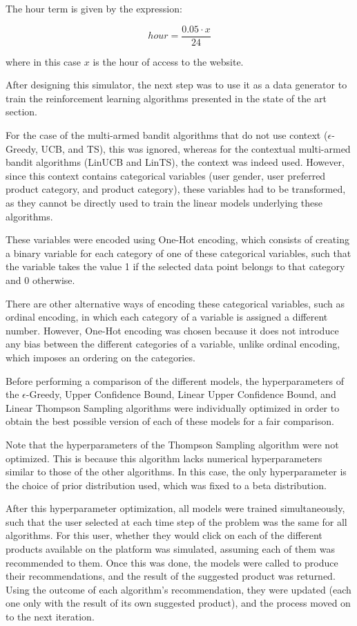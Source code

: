 \documentclass[../main.tex]{subfiles}
\begin{document}
The hour term is given by the expression:  

\begin{equation*}
    hour= \dfrac{0.05 \cdot x}{24}
\end{equation*}

where in this case $x$ is the hour of access to the website.  

After designing this simulator, the next step was to use it as a data generator to train the 
reinforcement learning algorithms presented in the state of the art section.  

For the case of the multi-armed bandit algorithms that do not use context ($\epsilon$-Greedy, UCB, and TS), 
this was ignored, whereas for the contextual multi-armed bandit algorithms (LinUCB and LinTS), 
the context was indeed used. However, since this context contains categorical variables (user gender, 
user preferred product category, and product category), these variables had to be transformed, as they 
cannot be directly used to train the linear models underlying these algorithms.  

These variables were encoded using One-Hot encoding, which consists of creating a binary variable for 
each category of one of these categorical variables, such that the variable takes the value 1 if the 
selected data point belongs to that category and 0 otherwise.  

There are other alternative ways of encoding these categorical variables, such as ordinal encoding, in 
which each category of a variable is assigned a different number. However, One-Hot encoding was chosen 
because it does not introduce any bias between the different categories of a variable, unlike ordinal 
encoding, which imposes an ordering on the categories.  

Before performing a comparison of the different models, the hyperparameters of the $\epsilon$-Greedy, Upper 
Confidence Bound, Linear Upper Confidence Bound, and Linear Thompson Sampling algorithms were individually 
optimized in order to obtain the best possible version of each of these models for a fair comparison.  

Note that the hyperparameters of the Thompson Sampling algorithm were not optimized. This is because this 
algorithm lacks numerical hyperparameters similar to those of the other algorithms. In this case, the only 
hyperparameter is the choice of prior distribution used, which was fixed to a beta distribution.  

After this hyperparameter optimization, all models were trained simultaneously, such that the user selected 
at each time step of the problem was the same for all algorithms. For this user, whether they would click on 
each of the different products available on the platform was simulated, assuming each of them was recommended 
to them. Once this was done, the models were called to produce their recommendations, and the result of the 
suggested product was returned. Using the outcome of each algorithm’s recommendation, they were updated 
(each one only with the result of its own suggested product), and the process moved on to the next iteration.  
\end{document}
